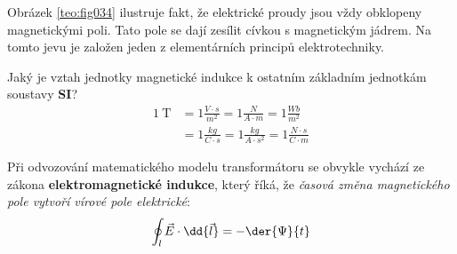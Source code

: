 
    Obrázek \ref{teo:fig034} ilustruje fakt, že elektrické proudy jsou vždy obklopeny 
    magnetickými poli. Tato pole se dají zesílit cívkou s magnetickým jádrem. Na tomto jevu je 
    založen jeden z elementárních principů elektrotechniky.    
       
    \begin{mdframed}[style=mdnote]
      Jaký je vztah jednotky magnetické indukce k ostatním základním jednotkám soustavy \textbf{SI}? 
      \begin{align*}
        \SI{1}{\tesla}
          &= 1\frac{V\cdot s}{m^2} = 1\frac{N}{A\cdot m} = 1\frac{Wb}{m^2}          \\
          &= 1\frac{kg}{C\cdot s} = 1\frac{kg}{A\cdot s^2} = 1\frac{N\cdot s}{C \cdot m}
      \end{align*}
    \end{mdframed}
    
    Při odvozování matematického modelu transformátoru se obvykle vychází ze zákona 
    \textbf{elektromagnetické indukce}, který říká, že \emph{časová změna magnetického pole vytvoří 
    vírové pole elektrické}:
    \begin{equation}\label{es:eq_ind_z}
      \oint_l \vec{E} \cdot \dd{\vec{l}} = - \der{\Psi}{t}
    \end{equation}
     
